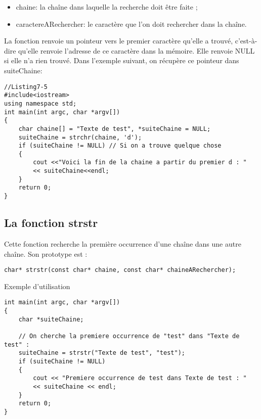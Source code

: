 \documentclass[a4paper, oneside,11pt]{book}
\begin{document}
\begin{itemize}
\item    chaine: la cha\^ine dans laquelle la recherche doit \^etre faite ;

\item    caractereARechercher: le caract\`ere que l'on doit rechercher dans la cha\^ine.
\end{itemize}





La fonction renvoie un pointeur vers le premier caract\`ere qu'elle a trouv\'e, c'est-\`a-dire qu'elle renvoie l'adresse de ce caract\`ere dans la m\'emoire. Elle renvoie NULL si elle n'a 
rien trouv\'e.
Dans l'exemple suivant, on r\'ecup\`ere ce pointeur dans suiteChaine:

\begin{lstlisting}
//Listing7-5
#include<iostream>
using namespace std;
int main(int argc, char *argv[])
{
    char chaine[] = "Texte de test", *suiteChaine = NULL;
    suiteChaine = strchr(chaine, 'd');
    if (suiteChaine != NULL) // Si on a trouve quelque chose
    {
        cout <<"Voici la fin de la chaine a partir du premier d : "
        << suiteChaine<<endl;
    }
    return 0;
}
\end{lstlisting}



\subsection{La fonction strstr}


Cette fonction recherche la premi\`ere occurrence d'une cha\^ine dans une autre
cha\^ine.
Son prototype est :

\begin{lstlisting}
char* strstr(const char* chaine, const char* chaineARechercher);
\end{lstlisting}

Exemple  d'utilisation

\begin{lstlisting}
int main(int argc, char *argv[])
{
    char *suiteChaine;

    // On cherche la premiere occurrence de "test" dans "Texte de test" :
    suiteChaine = strstr("Texte de test", "test");
    if (suiteChaine != NULL)
    {
        cout << "Premiere occurrence de test dans Texte de test : " 
        << suiteChaine << endl;
    }
    return 0;
}
\end{lstlisting}
\end{document}
